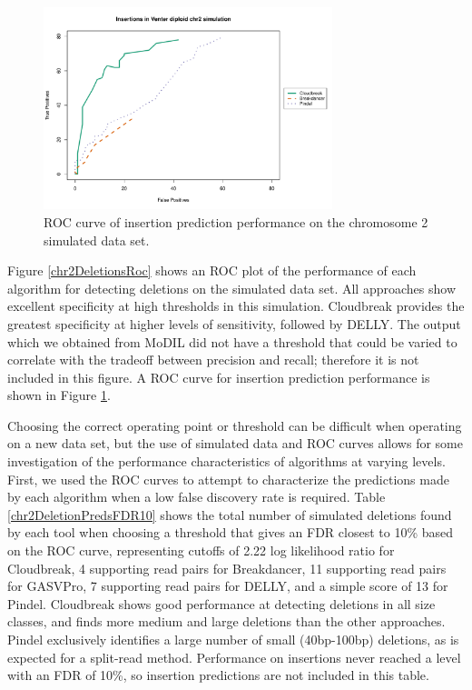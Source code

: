 \documentclass[11pt]{article}
\begin{document}
\begin{figure}
\centering
\includegraphics[width=0.75\textwidth]{../figures/CHR2SIM_INS_ROC.pdf}
\caption{ROC curve of insertion prediction performance on the chromosome 2 simulated data set.}
\label{chr2InsertionsRoc}
\end{figure}

Figure \ref{chr2DeletionsRoc} shows an ROC plot of the performance of each algorithm for detecting deletions on the simulated data set. All approaches show excellent specificity at high thresholds in this simulation. Cloudbreak provides the greatest specificity at higher levels of sensitivity, followed by DELLY. The output which we obtained from MoDIL did not have a threshold that could be varied to correlate with the tradeoff between precision and recall; therefore it is not included in this figure. A ROC curve for insertion prediction performance is shown in Figure \ref{chr2InsertionsRoc}.

Choosing the correct operating point or threshold can be difficult when operating on a new data set, but the use of simulated data and ROC curves allows for some investigation of the performance characteristics of algorithms at varying levels. First, we used the ROC curves to attempt to characterize the predictions made by each algorithm when a low false discovery rate is required. Table \ref{chr2DeletionPredsFDR10} shows the total number of simulated deletions found by each tool when choosing a threshold that gives an FDR closest to 10\% based on the ROC curve, representing cutoffs of 2.22 log likelihood ratio for Cloudbreak, 4 supporting read pairs for Breakdancer, 11 supporting read pairs for GASVPro, 7 supporting read pairs for DELLY, and a simple score of 13 for Pindel. Cloudbreak shows good performance at detecting deletions in all size classes, and finds more medium and large deletions than the other approaches. Pindel exclusively identifies a large number of small (40bp-100bp) deletions, as is expected for a split-read method. Performance on insertions never reached a level with an FDR of 10\%, so insertion predictions are not included in this table.
\end{document}
